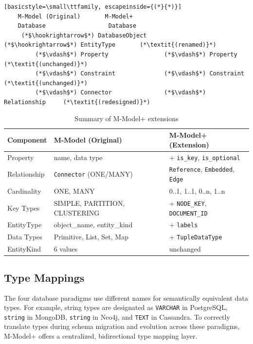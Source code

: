 \begin{table}[htbp]
    \centering
    \caption{Summary of M-Model+ extensions}
    \label{tab:meta-extensions}

    \begin{lstlisting}[basicstyle=\small\ttfamily, escapeinside={(*}{*)}]
    M-Model (Original)       M-Model+
    Database                  Database
     (*$\hookrightarrow$*) DatabaseObject         (*$\hookrightarrow$*) EntityType       (*\textit{(renamed)}*)
         (*$\vdash$*) Property                (*$\vdash$*) Property        (*\textit{(unchanged)}*)
         (*$\vdash$*) Constraint              (*$\vdash$*) Constraint       (*\textit{(unchanged)}*)
         (*$\vdash$*) Connector               (*$\vdash$*) Relationship     (*\textit{(redesigned)}*)
    \end{lstlisting}
    \vspace{0.2cm}
    \begin{tabular}{lll}
    \hline
    \textbf{Component} & \textbf{M-Model (Original)} & \textbf{M-Model+ (Extension)} \\
    \hline
    Property & name, data type & + \texttt{is\_key}, \texttt{is\_optional} \\
    Relationship & \texttt{Connector} (ONE/MANY) & \texttt{Reference}, \texttt{Embedded}, \texttt{Edge} \\
    Cardinality & ONE, MANY & 0..1, 1..1, 0..n, 1..n \\
    Key Types & SIMPLE, PARTITION, CLUSTERING & + \texttt{NODE\_KEY}, \texttt{DOCUMENT\_ID} \\
    EntityType & object\_name, entity\_kind & + \texttt{labels} \\
    Data Types & Primitive, List, Set, Map & + \texttt{TupleDataType} \\
    EntityKind & 6 values & unchanged \\
    \hline
    \end{tabular}
  \end{table}


\subsection{Type Mappings}\label{subsec:meta-type-mappings}
  The four database paradigms use different names for semantically equivalent data types. For example, string types are designated as \texttt{VARCHAR} in PostgreSQL, \texttt{string} in MongoDB, \texttt{string} in Neo4j, and \texttt{TEXT} in Cassandra. To correctly translate
  types during schema migration and evolution across these paradigms, M-Model+ offers a centralized, bidirectional type mapping layer.

